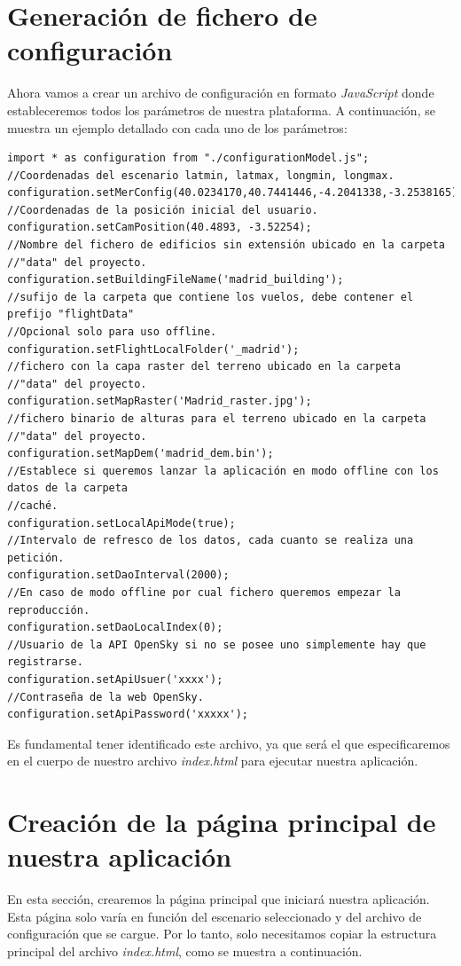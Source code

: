 \documentclass[a4paper, 11pt]{book}
\begin{document}
\section{Generación de fichero de configuración}
Ahora vamos a crear un archivo de configuración en formato \emph{JavaScript} donde estableceremos todos los parámetros de nuestra plataforma. 
A continuación, se muestra un ejemplo detallado con cada uno de los parámetros:
\begin{verbatim}
import * as configuration from "./configurationModel.js";
//Coordenadas del escenario latmin, latmax, longmin, longmax.
configuration.setMerConfig(40.0234170,40.7441446,-4.2041338,-3.2538165);
//Coordenadas de la posición inicial del usuario.
configuration.setCamPosition(40.4893, -3.52254);
//Nombre del fichero de edificios sin extensión ubicado en la carpeta 
//"data" del proyecto.
configuration.setBuildingFileName('madrid_building');
//sufijo de la carpeta que contiene los vuelos, debe contener el prefijo "flightData"
//Opcional solo para uso offline.
configuration.setFlightLocalFolder('_madrid');
//fichero con la capa raster del terreno ubicado en la carpeta 
//"data" del proyecto.
configuration.setMapRaster('Madrid_raster.jpg');
//fichero binario de alturas para el terreno ubicado en la carpeta 
//"data" del proyecto.
configuration.setMapDem('madrid_dem.bin');
//Establece si queremos lanzar la aplicación en modo offline con los datos de la carpeta
//caché.
configuration.setLocalApiMode(true);
//Intervalo de refresco de los datos, cada cuanto se realiza una petición.
configuration.setDaoInterval(2000);
//En caso de modo offline por cual fichero queremos empezar la reproducción.
configuration.setDaoLocalIndex(0);
//Usuario de la API OpenSky si no se posee uno simplemente hay que registrarse.
configuration.setApiUsuer('xxxx');
//Contraseña de la web OpenSky.
configuration.setApiPassword('xxxxx');
\end{verbatim}
Es fundamental tener identificado este archivo, ya que será el que especificaremos en el cuerpo de nuestro archivo \emph{index.html} para ejecutar nuestra aplicación.
\section{Creación de la página principal de nuestra aplicación}
En esta sección, crearemos la página principal que iniciará nuestra aplicación. Esta página solo varía en función del escenario seleccionado y del archivo de configuración que se cargue. Por lo tanto, solo necesitamos copiar la estructura principal del archivo \emph{index.html}, como se muestra a continuación. 
\end{document}
